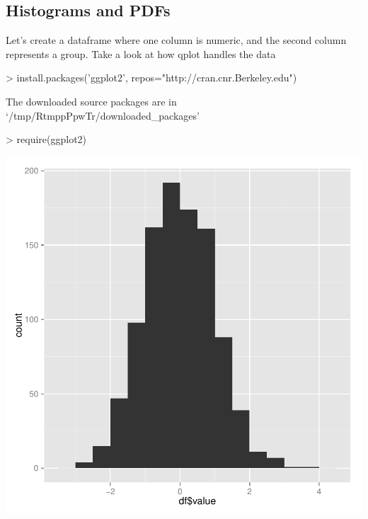 \documentclass{article}
\begin{document}
\subsection{Histograms and PDFs}

Let's create a dataframe where one column is numeric, and the second column
represents a group.  Take a look at how qplot handles the data

\begin{Schunk}
\begin{Sinput}
> install.packages('ggplot2', repos="http://cran.cnr.Berkeley.edu")
\end{Sinput}
\begin{Soutput}
The downloaded source packages are in
	‘/tmp/RtmppPpwTr/downloaded_packages’
\end{Soutput}
\begin{Sinput}
> require(ggplot2)
\end{Sinput}
\end{Schunk}

\begin{Schunk}
\end{Schunk}
\includegraphics{cookbook-032}
\end{document}
